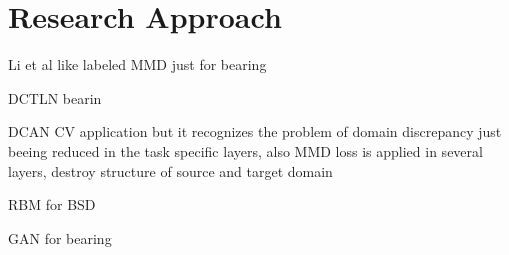 \chapter{Research Approach}\label{chapter:research_approach}

Li et al \cite{Li2018} like labeled MMD just for bearing

DCTLN \cite{Guo2019} bearin 

DCAN CV application but it recognizes the problem of domain discrepancy just beeing reduced in the task specific layers, also MMD loss is applied in several layers, destroy structure of source and target domain

RBM for BSD

GAN for bearing
